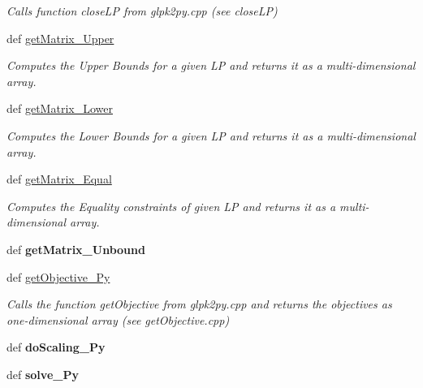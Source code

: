 \begin{DoxyCompactItemize}
\begin{DoxyCompactList}\small\item\em Calls function close\-L\-P from glpk2py.\-cpp (see close\-L\-P) \end{DoxyCompactList}\item 
def \hyperlink{namespacewrapper_af85ce18c809a907acb3f5e8dbaa9fd2f}{get\-Matrix\-\_\-\-Upper}
\begin{DoxyCompactList}\small\item\em Computes the Upper Bounds for a given L\-P and returns it as a multi-\/dimensional array. \end{DoxyCompactList}\item 
def \hyperlink{namespacewrapper_aab3037fb34f946a592208efe61eae6d3}{get\-Matrix\-\_\-\-Lower}
\begin{DoxyCompactList}\small\item\em Computes the Lower Bounds for a given L\-P and returns it as a multi-\/dimensional array. \end{DoxyCompactList}\item 
def \hyperlink{namespacewrapper_ae0bdfc2adf409de2a31aa8080b3ea92a}{get\-Matrix\-\_\-\-Equal}
\begin{DoxyCompactList}\small\item\em Computes the Equality constraints of given L\-P and returns it as a multi-\/dimensional array. \end{DoxyCompactList}\item 
\hypertarget{namespacewrapper_a74fef5c27b34c8176a2c4bf1a8bf787c}{def {\bfseries get\-Matrix\-\_\-\-Unbound}}\label{namespacewrapper_a74fef5c27b34c8176a2c4bf1a8bf787c}

\item 
def \hyperlink{namespacewrapper_a8a2cc634e4351219ec187fc8920a0e0b}{get\-Objective\-\_\-\-Py}
\begin{DoxyCompactList}\small\item\em Calls the function get\-Objective from glpk2py.\-cpp and returns the objectives as one-\/dimensional array (see get\-Objective.\-cpp) \end{DoxyCompactList}\item 
\hypertarget{namespacewrapper_a5d6cc1569656eeacf197bacbd2bfc1c6}{def {\bfseries do\-Scaling\-\_\-\-Py}}\label{namespacewrapper_a5d6cc1569656eeacf197bacbd2bfc1c6}

\item 
\hypertarget{namespacewrapper_a6664efcb2ed0386c07d4dd97d9bcf6bc}{def {\bfseries solve\-\_\-\-Py}}\label{namespacewrapper_a6664efcb2ed0386c07d4dd97d9bcf6bc}

\end{DoxyCompactItemize}


